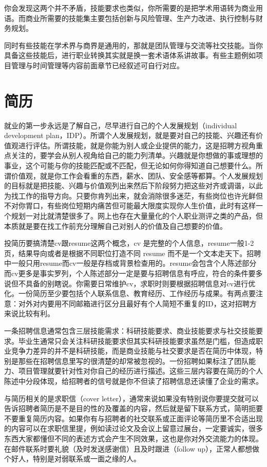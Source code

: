 \documentclass[]{tufte-book}
\begin{document}
你会发现这两个并不矛盾，技能要求也类似，你所需要的是把学术用语转为商业用语。而商业所需要的技能集主要包括创新与风险管理、生产力改进、执行控制与财务规划。

同时有些技能在学术界与商界是通用的，那就是团队管理与交流等社交技能。当你具备这些技能后，进行职业转换其实就是换一套术语体系讲故事。有些主题例如项目管理与时间管理等内容前面章节已经叙述可自行对应。

\hypertarget{ux7b80ux5386}{%
\section{简历}\label{ux7b80ux5386}}

就业的第一步永远是了解自己，尽早进行自己的个人发展规划（individual development plan，IDP）。所谓个人发展规划，就是要对自己的技能、兴趣还有价值观进行评估。所谓技能，就是你能为别人或企业提供的能力，这是招聘方视角重点关注的，要学会从别人视角给自己的能力列清单。兴趣就是你想做的事或理想的事业，这个可能与你的技能匹配或不匹配，但无论如何你得知道自己想要什么。所谓价值观，就是你工作会看重的东西，薪水、团队、安全感等都算。个人发展规划的目标就是把技能、兴趣与价值观列出来然后下阶段努力把这些对齐或调谐，以此为找工作的指导方向。只要你肯列出来，就会消除很多迷茫，有些岗位也许光鲜但不对你胃口，有些岗位短期内痛苦但可能最大限度实现你人生价值，此时有这样一个规划一对比就清楚很多了。网上也存在大量量化的个人职业测评之类的产品，但本质就是要在找工作前充分理解自己对别人的价值及自己想要的价值。

投简历要搞清楚cv跟resume这两个概念，cv 是完整的个人信息，resume一般1-2页，结果导向或者是根据不同职位打造不同 resume 而不是一个文本走天下。招聘中一般只用resume而cv一般是存档或背景检查用的。resume会包含个人陈述部分而cv更多是事实罗列，个人陈述部分一定是要与招聘信息有呼应，符合的条件要多说但不具备的别瞎说。你需要日常维护cv，求职时则要根据招聘信息对cv进行优化。一份简历至少要包括个人联系信息、教育经历、工作经历与成果。有两点要注意：对外对内要用不同邮箱进行区分且最好有个人简短不重复的ID，这对招聘方来说比较有利。

一条招聘信息通常包含三层技能需求：科研技能要求、商业技能要求与社交技能要求。毕业生通常只会关注科研技能要求但其实科研技能要求虽然是门槛，但造成职业竞争力差异的并不是科研技能，而是商业技能与社交要求是否在简历中体现，特别是那些在招聘信息里写的很清楚的却常被忽视的。一份招聘如果标注了团队能力、项目管理就要针对性对你自己的经历进行描述。这些三层内容要在简历的个人陈述中分段体现，给招聘者的信号就是你不但读了招聘信息还读懂了企业的需求。

与简历相关的是求职信（cover letter），通常来说如果没有特别说你要提交就可以告诉招聘者简历是不是目的性的及覆盖的内容，然后就是留下联系方式，简明扼要不要重复简历内容。如果你有与招聘者的社交联系或正面评论等简历里不合适出现的内容可以在求职信里提，例如读过论文及会议上留意过展台，一定要诚实，很多东西大家都懂但不同的表述方式会产生不同效果，这也是你对外交流能力的体现。在邮件联系时要礼貌（及时发送感谢信）且及时跟进（follow up），正常人都想做个好人，特别是对弱联系或一面之缘的人。
\end{document}
